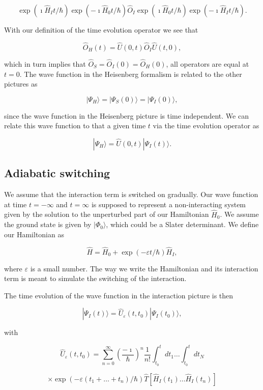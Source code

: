 \[
\exp{(\imath\hat{H}_It/\hbar)}\exp{(-\imath\hat{H}_0t/\hbar)}\hat{O}_I\exp{(\imath\hat{H}_0t/\hbar)}\exp{(-\imath\hat{H}_It/\hbar)}.
\]

With our definition of the time evolution operator we see that

\[
\hat{O}_H(t)=\hat{U}(0,t)\hat{O}_I\hat{U}(t,0),
\]

which in turn implies that $\hat{O}_S=\hat{O}_I(0)=\hat{O}_H(0)$, all operators are equal at $t=0$. The wave function in the Heisenberg formalism is 
related to the other pictures as 

\[
|\Psi_H\rangle=|\Psi_S(0)\rangle=|\Psi_I(0)\rangle,
\]

since the wave function in the Heisenberg picture is time independent. 
We can relate this wave function to that a given time $t$ via the time evolution operator as

\[
|\Psi_H\rangle=\hat{U}(0,t)|\Psi_I(t)\rangle.
\]


\subsection{Adiabatic switching}


We assume that the interaction term is switched on gradually. Our wave function at time $t=-\infty$ and $t=\infty$ is supposed to represent a non-interacting system
given by the solution to the unperturbed part of our Hamiltonian $\hat{H}_0$.
We assume the ground state is given by $|\Phi_0\rangle$, which could be a Slater determinant.
We define our Hamiltonian as

\[
\hat{H}=\hat{H}_0+\exp{(-\varepsilon t/\hbar)}\hat{H}_I,
\]

where $\varepsilon$ is a small number. The way we write the Hamiltonian 
and its interaction term is meant to simulate the switching of the interaction.



The time evolution of the wave function in the interaction picture is then

\[
|\Psi_I(t) \rangle = \hat{U}_{\varepsilon}(t,t_0)|\Psi_I(t_0)\rangle,
\]

with 

\[
\hat{U}_{\varepsilon}(t,t_0)=\sum_{n=0}^{\infty}\left(\frac{-\imath}{\hbar}\right)^n\frac{1}{n!}
\int_{t_0}^t dt_1\dots \int_{t_0}^t dt_N
\]


\[
\times \exp{(-\varepsilon(t_1+\dots+t_n)/\hbar)}\hat{T}\left[\hat{H}_I(t_1)\dots\hat{H}_I(t_n)\right]
\]



